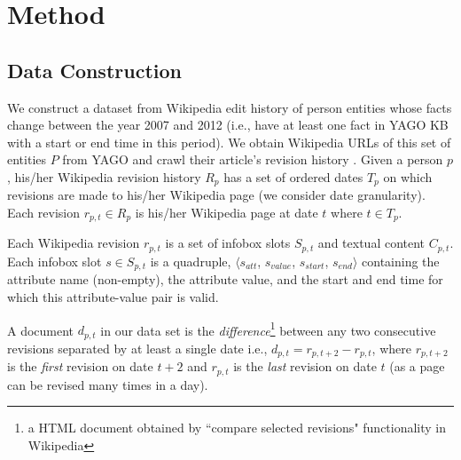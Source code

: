 \section{Method} \label{sec:method}

\subsection{Data Construction} \label{sec:data}
We construct a dataset from Wikipedia edit history of person entities whose facts change between the year 2007 and 2012 (i.e., have at least one fact in YAGO KB \cite{suchanek2007yago} with a start or end time in this period). We obtain Wikipedia URLs of this set of entities $P$ from YAGO and crawl their article's revision history%
. Given a person $p$, his/her Wikipedia revision history $R_p$ has a set of ordered dates $T_p$ on which revisions are made to his/her Wikipedia page (we consider date granularity). Each revision $r_{p, t} \in R_p$ is his/her Wikipedia page at date $t$ where $t \in T_p$. 


Each Wikipedia revision $r_{p, t}$ is a set of infobox slots $S_{p, t}$ and textual content $C_{p, t}$. Each infobox slot $s \in S_{p, t}$ is a quadruple, $\langle s_{att}$, $s_{value}$,  $s_{start}$, $s_{end} \rangle$ containing the attribute name (non-empty), the attribute value, and the start and end time for which this attribute-value pair is valid. 

A document $d_{p, t}$ in our data set is the \textit{difference}\footnote{a HTML document obtained by ``compare selected revisions"  functionality in Wikipedia} between any two consecutive revisions separated by at least a single date i.e., $d_{p, t} = r_{p, t+2} - r_{p, t}$, where $r_{p, t+2}$ is the \textit{first} revision on date $t+2$ and $r_{p, {t}}$ is the \textit{last} revision on date $t$ (as a page can be revised many times in a day). 

